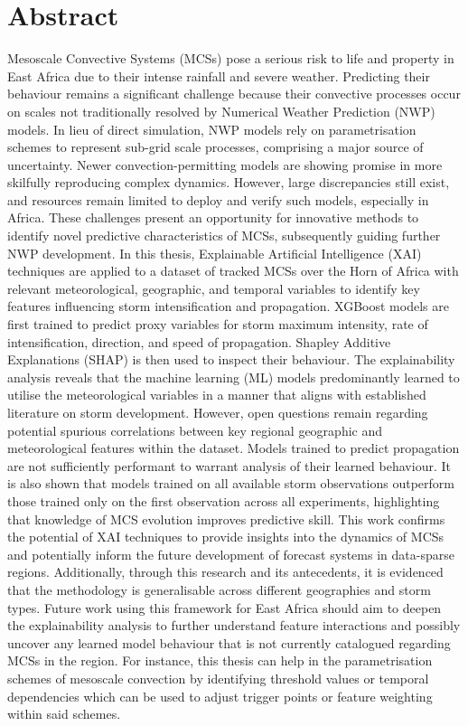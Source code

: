\chapter*{\center \Large  Abstract}

\noindent
Mesoscale Convective Systems (MCSs) pose a serious risk to life and property in East Africa due to their intense rainfall and severe weather. Predicting their behaviour remains a significant challenge because their convective processes occur on scales not traditionally resolved by Numerical Weather Prediction (NWP) models. In lieu of direct simulation, NWP models rely on parametrisation schemes to represent sub-grid scale processes, comprising a major source of uncertainty. Newer convection-permitting models are showing promise in more skilfully reproducing complex dynamics. However, large discrepancies still exist, and resources remain limited to deploy and verify such models, especially in Africa. These challenges present an opportunity for innovative methods to identify novel predictive characteristics of MCSs, subsequently guiding further NWP development. In this thesis, Explainable Artificial Intelligence (XAI) techniques are applied to a dataset of tracked MCSs over the Horn of Africa with relevant meteorological, geographic, and temporal variables to identify key features influencing storm intensification and propagation. XGBoost models are first trained to predict proxy variables for storm maximum intensity, rate of intensification, direction, and speed of propagation. Shapley Additive Explanations (SHAP) is then used to inspect their behaviour. The explainability analysis reveals that the machine learning (ML) models predominantly learned to utilise the meteorological variables in a manner that aligns with established literature on storm development. However, open questions remain regarding potential spurious correlations between key regional geographic and meteorological features within the dataset. Models trained to predict propagation are not sufficiently performant to warrant analysis of their learned behaviour. It is also shown that models trained on all available storm observations outperform those trained only on the first observation across all experiments, highlighting that knowledge of MCS evolution improves predictive skill. This work confirms the potential of XAI techniques to provide insights into the dynamics of MCSs and potentially inform the future development of forecast systems in data-sparse regions. Additionally, through this research and its antecedents, it is evidenced that the methodology is generalisable across different geographies and storm types. Future work using this framework for East Africa should aim to deepen the explainability analysis to further understand feature interactions and possibly uncover any learned model behaviour that is not currently catalogued regarding MCSs in the region. For instance, this thesis can help in the parametrisation schemes of mesoscale convection by identifying threshold values or temporal dependencies which can be used to adjust trigger points or feature weighting within said schemes.

